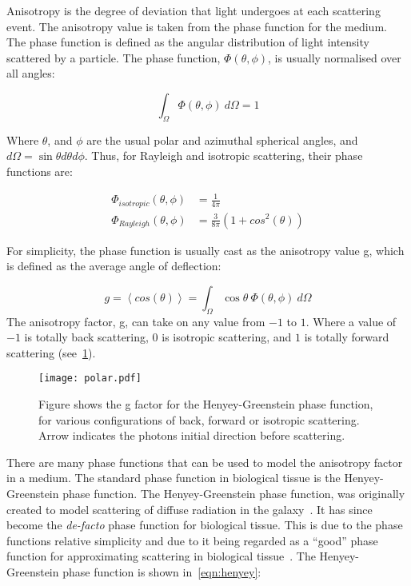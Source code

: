 Anisotropy is the degree of deviation that light undergoes at each scattering event. The anisotropy value is taken from the phase function for the medium. The phase function is defined as the angular distribution of light intensity scattered by a particle. The phase function, $\Phi(\theta,\phi)$, is usually normalised over all angles:

\begin{equation}
	\int_{\Omega}\Phi(\theta,\phi)\ d\Omega = 1
\end{equation}

Where $\theta$, and $\phi$ are the usual polar and azimuthal spherical angles, and $d\Omega=\sin\theta d\theta d\phi$.
Thus, for Rayleigh and isotropic scattering, their phase functions are:

\begin{align}
	\Phi_{isotropic}(\theta,\phi)&=\frac{1}{4\pi}\\
	\Phi_{Rayleigh}(\theta,\phi)&=\frac{3}{8\pi}(1+cos^2(\theta))
\end{align}

For simplicity, the phase function is usually cast as the anisotropy value g, which is defined as the average angle of deflection:

\begin{equation}
	g=\left<cos(\theta)\right>=\int_{\Omega}\cos\theta\ \Phi(\theta,\phi)\ d\Omega
\end{equation}
The anisotropy factor, g, can take on any value from $-1$ to $1$. Where a value of $-1$ is totally back scattering, $0$ is isotropic scattering, and $1$ is totally forward scattering (see~\cref{fig:henyey}).

\begin{figure}[!htbp]
	\centering
	\texttt{[image: polar.pdf]}
	\caption{Figure shows the g factor for the Henyey-Greenstein phase function, for various configurations of back, forward or isotropic scattering. Arrow indicates the photons initial direction before scattering.}
	\label{fig:henyey}
\end{figure}
There are many phase functions that can be used to model the anisotropy factor in a medium. The standard phase function in biological tissue is the Henyey-Greenstein phase function. The Henyey-Greenstein phase function, was originally created to model scattering of diffuse radiation in the galaxy~\cite{lister2012optical,henyey1941diffuse}. It has since become the \textit{de-facto} phase function for biological tissue. This is due to the phase functions relative simplicity and due to it being regarded as a ``good'' phase function for approximating scattering in biological tissue~\cite{jacques1987angular}.
The Henyey-Greenstein phase function is shown in~\cref{eqn:henyey}:

